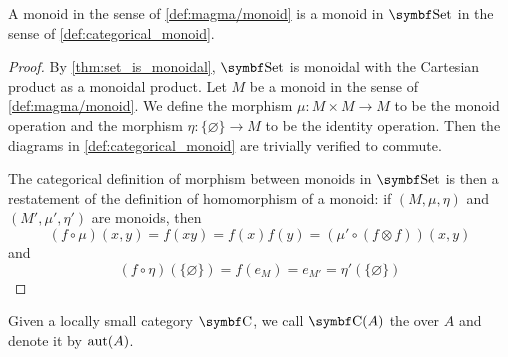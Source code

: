 \begin{proposition}\label{thm:monoids_are_monoids_in_set}
  A monoid in the sense of \cref{def:magma/monoid} is a monoid in \( \Cat{Set} \) in the sense of \cref{def:categorical_monoid}.
\end{proposition}
\begin{proof}
  By \cref{thm:set_is_monoidal}, \( \Cat{Set} \) is monoidal with the Cartesian product as a monoidal product. Let \( M \) be a monoid in the sense of \cref{def:magma/monoid}. We define the morphism \( \mu: M \times M \to M \) to be the monoid operation and the morphism \( \eta: \{ \varnothing \} \to M \) to be the identity operation. Then the diagrams in \cref{def:categorical_monoid} are trivially verified to commute.

  The categorical definition of morphism between monoids in \( \Cat{Set} \) is then a restatement of the definition of homomorphism of a monoid: if \( (M, \mu, \eta) \) and \( (M', \mu', \eta') \) are monoids, then
  \begin{equation*}
    (f \circ \mu)(x, y)
    =
    f(xy)
    =
    f(x) f(y)
    =
    (\mu' \circ (f \otimes f))(x, y)
  \end{equation*}
  and
  \begin{equation*}
    (f \circ \eta)(\{ \varnothing \})
    =
    f(e_M)
    =
    e_{M'}
    =
    \eta'(\{ \varnothing \})
  \end{equation*}
\end{proof}

\begin{definition}\label{def:automorphism_group}
  Given a locally small category \( \Cat{C} \), we call \( \Cat{C}(A) \) the  over \( A \) and denote it by \( \operatorname{aut}(A) \).
\end{definition}

